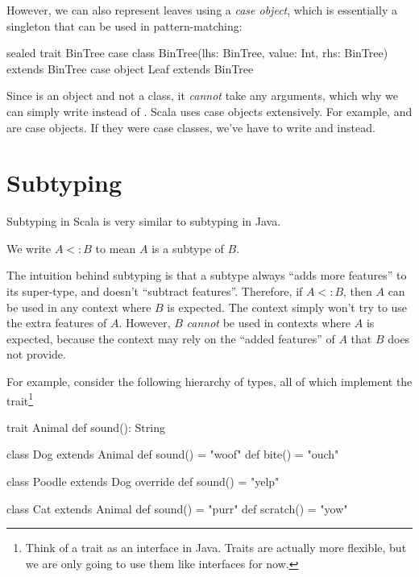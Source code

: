 \documentclass[9pt]{extbook}
\begin{document}
However, we can also represent leaves using a \emph{case object}, which is essentially
a singleton that can be used in pattern-matching:
%
\begin{scalacode}
sealed trait BinTree
case class BinTree(lhs: BinTree, value: Int, rhs: BinTree) extends BinTree
case object Leaf extends BinTree
\end{scalacode}

Since  is an object and not a class, it \emph{cannot}
take any arguments, which why we can simply write  instead
of . Scala uses case objects extensively. For example,
 and  are case objects. If they
were case classes, we've have to write  and
 instead.

\section{Subtyping}

Subtyping in Scala is very similar to subtyping in Java.

\begin{notation}
We write $A <: B$ to mean $A$ is a subtype of $B$.
\end{notation}

The intuition behind subtyping is that a subtype always ``adds more features''
to its super-type, and doesn't ``subtract features''. Therefore, if $A <: B$,
then $A$ can be used in any context where $B$ is expected. The context simply
won't try to use the extra features of $A$. However, $B$ \emph{cannot}
be used in contexts where $A$ is expected, because the context may rely on
the ``added features'' of $A$ that $B$ does not provide.

For example, consider the following hierarchy of types, all of which
implement the  trait\footnote{Think of a trait as an interface in Java. Traits
are actually more flexible, but we are only going to use them like interfaces for now.}
%
\begin{scalacode}
trait Animal {
  def sound(): String
}

class Dog extends Animal {
  def sound() = "woof"
  def bite() = "ouch"
}

class Poodle extends Dog {
  override def sound() = "yelp"
}

class Cat extends Animal {
  def sound() = "purr"
  def scratch() = "yow"
}
\end{scalacode}
\end{document}
